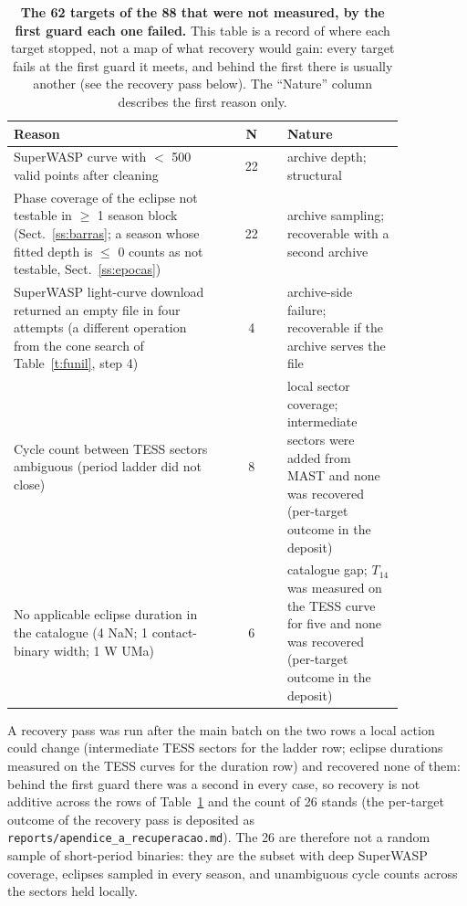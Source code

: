 \documentclass{aa}
\begin{document}
\begin{table}
\caption{\textbf{The 62 targets of the 88 that were not measured, by the first guard each one failed.} This table is a record of where each target stopped, not a map of what recovery would gain: every target fails at the first guard it meets, and behind the first there is usually another (see the recovery pass below). The ``Nature'' column describes the first reason only.}
\label{t:naomedidos}
\centering
\begin{tabular}{p{0.55\linewidth} c p{0.30\linewidth}}
\hline\hline
Reason & N & Nature\\
\hline
SuperWASP curve with $<$ 500 valid points after cleaning & 22 & archive depth; structural\\
Phase coverage of the eclipse not testable in $\ge$ 1 season block (Sect.~\ref{ss:barras}; a season whose fitted depth is $\le$ 0 counts as not testable, Sect.~\ref{ss:epocas}) & 22 & archive sampling; recoverable with a second archive\\
SuperWASP light-curve download returned an empty file in four attempts (a different operation from the cone search of Table~\ref{t:funil}, step 4) & 4 & archive-side failure; recoverable if the archive serves the file\\
Cycle count between TESS sectors ambiguous (period ladder did not close) & 8 & local sector coverage; intermediate sectors were added from MAST and none was recovered (per-target outcome in the deposit)\\
No applicable eclipse duration in the catalogue (4 NaN; 1 contact-binary width; 1 W UMa) & 6 & catalogue gap; $T_{14}$ was measured on the TESS curve for five and none was recovered (per-target outcome in the deposit)\\
\hline
\end{tabular}
\end{table}
A recovery pass was run after the main batch on the two rows a local action could change (intermediate TESS sectors for the ladder row; eclipse durations measured on the TESS curves for the duration row) and recovered none of them: behind the first guard there was a second in every case, so recovery is not additive across the rows of Table~\ref{t:naomedidos} and the count of 26 stands (the per-target outcome of the recovery pass is deposited as \texttt{reports/apendice\_\allowbreak a\_\allowbreak recuperacao.md}). The 26 are therefore not a random sample of short-period binaries: they are the subset with deep SuperWASP coverage, eclipses sampled in every season, and unambiguous cycle counts across the sectors held locally.
\end{document}
